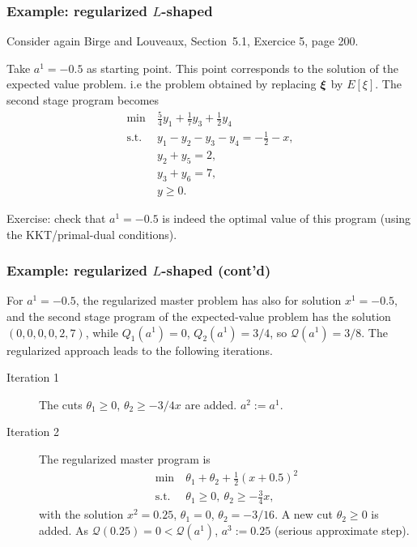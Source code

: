 \documentclass{beamer}
\begin{document}
\begin{frame}
\frametitle{Example: regularized $L$-shaped}

Consider again {\red Birge and Louveaux, Section~5.1, Exercice 5, page 200}.

Take $a^1 = -0.5$ as starting point.
This point corresponds to the solution of the expected value problem. i.e the problem obtained by replacing ${\boldsymbol{\xi}}$ by $E[\xi]$.
The second stage program becomes
\begin{align*}
\min\ & \frac{5}{4}y_1 + \frac{1}{7}y_3 + \frac{1}{2}y_4\\
\mbox{s.t. } & y_1 - y_2 - y_3 - y_4 = -\frac{1}{2}-x, \\
& y_2+y_5 = 2, \\
& y_3+y_6 = 7, \\
& y \geq 0.
\end{align*}

\mbox{}

{\blue Exercise}: check that $a^1 = -0.5$ is indeed the optimal value of this program (using the KKT/primal-dual conditions).
\end{frame}

\begin{frame}
\frametitle{Example: regularized $L$-shaped (cont'd)}

For $a^1 = -0.5$, the regularized master problem has also for solution $x^1 = -0.5$, and the second stage program of the expected-value problem has the solution $(0,0,0,0,2,7)$, while $Q_1(a^1) = 0$, $Q_2(a^1) = 3/4$, so $\mathcal{Q}(a^1) = 3/8$.
The regularized approach leads to the following iterations.
\begin{description}
\item[Iteration 1] The cuts $\theta_1 \geq 0$, $\theta_2 \geq -3/4
x$ are added. $a^2:= a^1$.
\item[Iteration 2]
The regularized master program is
\begin{align*}
\min\ & \theta_1 + \theta_2 + \frac{1}{2}(x+0.5)^2 \\
\mbox{s.t. } & \theta_1 \geq 0,\ \theta_2 \geq -\frac{3}{4}x,
\end{align*}
with the solution $x^2 = 0.25$, $\theta_1 = 0$, $\theta_2 = -3/16$.
A new cut $\theta_2 \geq 0$ is added.
As $\mathcal{Q}(0.25) = 0 < \mathcal{Q}(a^1)$, $a^3 := 0.25$ (serious approximate step).
\end{description}
\end{frame}
\end{document}
